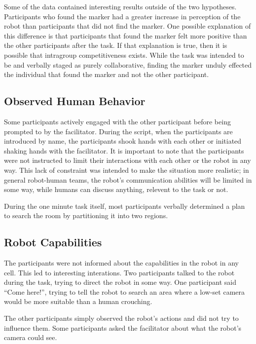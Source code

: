 \documentclass{acm_proc_article-sp}
\begin{document}
Some of the data contained interesting results outside of the two hypotheses. Participants who found the marker had a greater increase in perception of the robot than participants that did not find the marker. One possible explanation of this difference is that participants that found the marker felt more positive than the other participants after the task. If that explanation is true, then it is possible that intragroup competitiveness exists. While the task was intended to be and verbally staged as purely collaborative, finding the marker unduly effected the individual that found the marker and not the other participant.

\subsection{Observed Human Behavior}
\label{subsection:observed-human-human-behavior}
Some participants actively engaged with the other participant before being prompted to by the facilitator. During the script, when the participants are introduced by name, the participants shook hands with each other or initiated shaking hands with the facilitator. It is important to note that the participants were not instructed to limit their interactions with each other or the robot in any way. This lack of constraint was intended to make the situation more realistic; in general robot-human teams, the robot's communication abilities will be limited in some way, while humans can discuss anything, relevent to the task or not. 

During the one minute task itself, most participants verbally determined a plan to search the room by partitioning it into two regions. 

\subsection{Robot Capabilities}
\label{subsection:robot-capabilities}
The participants were not informed about the capabilities in the robot in any cell. This led to interesting interations. Two participants talked to the robot during the task, trying to direct the robot in some way. One participant said ``Come here!'', trying to tell the robot to search an area where a low-set camera would be more suitable than a human crouching. 

The other participants simply observed the robot's actions and did not try to influence them. Some participants asked the facilitator about what the robot's camera could see.
\end{document}
